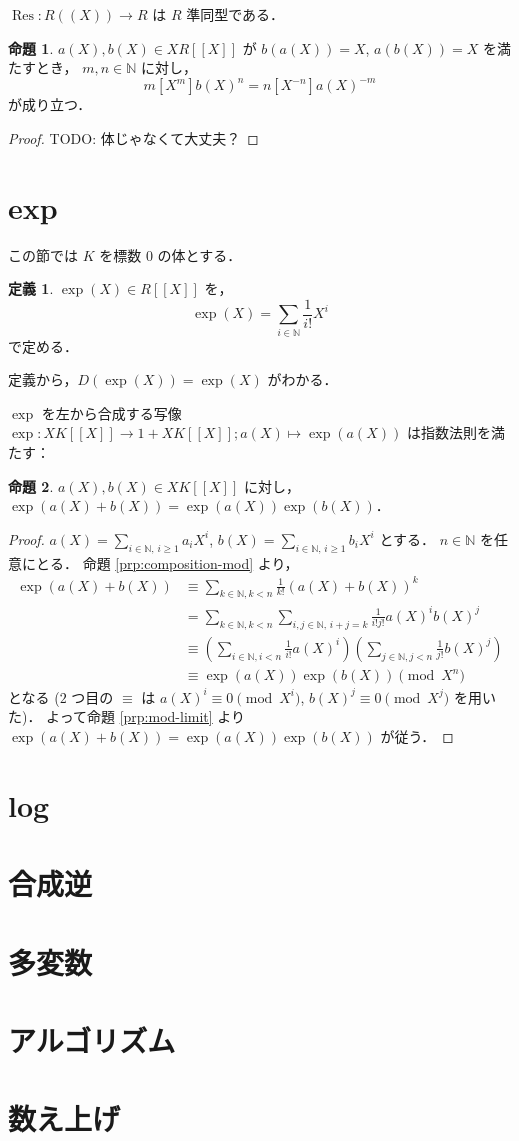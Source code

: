 \documentclass{jsarticle}
\DeclareMathOperator{\Res}{Res}
\newcommand{\N}{\mathbb{N}}
\newcommand{\longto}{\longrightarrow}
\theoremstyle{definition}
\newtheorem*{Dfn}{定義}
\newtheorem{Prp}{命題}
\newenvironment{dfn}{\vspace{1ex}\begin{screen}\begin{Dfn}}{\end{Dfn}\end{screen}\vspace{1ex}}
\newenvironment{prp}{\vspace{1ex}\begin{screen}\begin{Prp}}{\end{Prp}\end{screen}}
\newenvironment{prf}{\begin{leftbar}\begin{proof}}{\end{proof}\end{leftbar}}
\begin{document}
$\Res\colon R((X)) \longto R$ は $R$ 準同型である．

\begin{prp}
  $a(X), b(X) \in X R[[X]]$ が $b(a(X)) = X$, $a(b(X)) = X$ を満たすとき，
  $m, n \in \N$ に対し，
  \[
    m [X^m] b(X)^n = n [X^{-n}] a(X)^{-m}
  \]
  が成り立つ．
\end{prp}
\begin{prf}
  TODO: 体じゃなくて大丈夫？
\end{prf}


\section{exp}
この節では $K$ を標数 $0$ の体とする．

\begin{dfn}
  $\exp(X) \in R[[X]]$ を，
  \[
    \exp(X) = \sum_{i\in\N} \frac{1}{i!} X^i
  \]
  で定める．
\end{dfn}

定義から，$D(\exp(X)) = \exp(X)$ がわかる．

$\exp$ を左から合成する写像 $\exp\colon X K[[X]] \longto 1 + X K[[X]]; a(X) \longmapsto \exp(a(X))$ は指数法則を満たす：

\begin{prp}
  $a(X), b(X) \in X K[[X]]$ に対し，$\exp(a(X) + b(X)) = \exp(a(X)) \exp(b(X))$．
\end{prp}
\begin{prf}
  $a(X) = \sum_{i\in\N,\,i\ge 1} a_i X^i$, $b(X) = \sum_{i\in\N,\,i\ge 1} b_i X^i$ とする．
  $n \in \N$ を任意にとる．
  命題 \ref{prp:composition-mod} より，
  \begin{align*}
    \exp(a(X) + b(X))
    &\equiv \sum_{k\in\N,k<n} \frac{1}{k!} (a(X) + b(X))^k \\
    &= \sum_{k\in\N,k<n} \sum_{i,j\in\N,\,i+j=k} \frac{1}{i! j!} a(X)^i b(X)^j \\
    &\equiv \left(\sum_{i\in\N,i<n} \frac{1}{i!} a(X)^i\right) \left(\sum_{j\in\N,j<n} \frac{1}{j!} b(X)^j\right) \\
    &\equiv \exp(a(X)) \exp(b(X))
    \pmod{X^n}
  \end{align*}
  となる ($2$ つ目の $\equiv$ は $a(X)^i \equiv 0 \pmod{X^i}$, $b(X)^j \equiv 0 \pmod{X^j}$ を用いた)．
  よって命題 \ref{prp:mod-limit} より $\exp(a(X) + b(X)) = \exp(a(X)) \exp(b(X))$ が従う．
\end{prf}




\section{log}
\section{合成逆}
\section{多変数}
\section{アルゴリズム}
\section{数え上げ}
\end{document}

